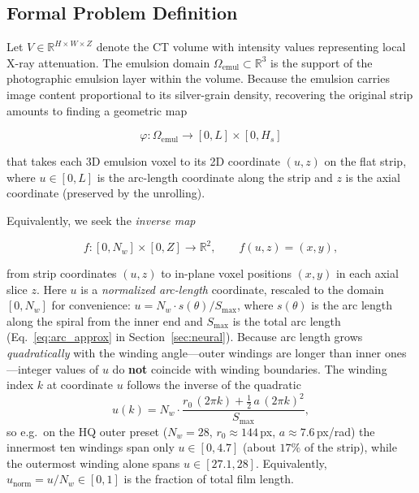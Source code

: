 \documentclass[11pt,a4paper]{article}
\newcommand{\R}{\mathbb{R}}
\begin{document}
\subsection{Formal Problem Definition}

Let $V \in \R^{H \times W \times Z}$ denote the CT volume with intensity values representing local X-ray attenuation. The emulsion domain $\Omega_{\text{emul}} \subset \R^3$ is the support of the photographic emulsion layer within the volume. Because the emulsion carries image content proportional to its silver-grain density, recovering the original strip amounts to finding a geometric map

\begin{equation}
    \varphi : \Omega_{\text{emul}} \longrightarrow [0, L] \times [0, H_s]
    \label{eq:fwd_map}
\end{equation}

that takes each 3D emulsion voxel to its 2D coordinate $(u, z)$ on the flat strip, where $u \in [0, L]$ is the arc-length coordinate along the strip and $z$ is the axial coordinate (preserved by the unrolling).

Equivalently, we seek the \emph{inverse map}

\begin{equation}
    f : [0, N_w] \times [0, Z] \longrightarrow \R^2, \qquad f(u, z) = (x, y),
    \label{eq:inv_map}
\end{equation}

from strip coordinates $(u, z)$ to in-plane voxel positions $(x, y)$ in each axial slice $z$. Here $u$ is a \emph{normalized arc-length} coordinate, rescaled to the domain $[0, N_w]$ for convenience: $u = N_w \cdot s(\theta)/S_{\max}$, where $s(\theta)$ is the arc length along the spiral from the inner end and $S_{\max}$ is the total arc length (Eq.~\eqref{eq:arc_approx} in Section~\ref{sec:neural}). Because arc length grows \emph{quadratically} with the winding angle---outer windings are longer than inner ones---integer values of $u$ do \textbf{not} coincide with winding boundaries. The winding index $k$ at coordinate $u$ follows the inverse of the quadratic
\begin{equation}
    u(k) = N_w \cdot \frac{r_0\,(2\pi k) + \tfrac{1}{2}\,a\,(2\pi k)^2}{S_{\max}},
    \label{eq:u_of_k}
\end{equation}
so e.g.\ on the HQ outer preset ($N_w = 28$, $r_0 \approx 144$\,px, $a \approx 7.6$\,px/rad) the innermost ten windings span only $u \in [0, 4.7]$ (about $17\%$ of the strip), while the outermost winding alone spans $u \in [27.1, 28]$. Equivalently, $u_{\text{norm}} = u/N_w \in [0, 1]$ is the fraction of total film length.
\end{document}
